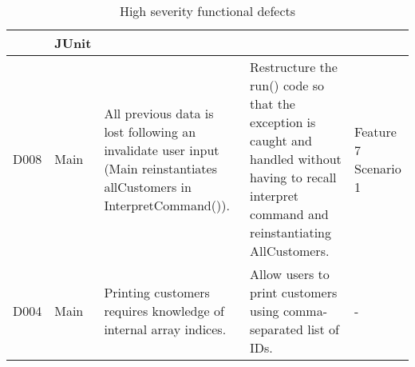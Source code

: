\begin{table}[H]
\begin{tabularx}{\textwidth}{| c | P | X | X | P |}
& JUnit  \\
\hline %
D008 
& Main
& All previous data is lost following an invalidate user input (Main reinstantiates allCustomers in InterpretCommand()).
& Restructure the run() code so that the exception is caught and handled without having to recall interpret command and reinstantiating AllCustomers. 
& Feature 7 Scenario 1 \\
\hline %
D004 
& Main 
& Printing customers requires knowledge of internal array indices.  
& Allow users to print customers using comma-separated list of IDs.
& -\\
\hline %
\end{tabularx}
\caption{High severity functional defects}
\end{table}